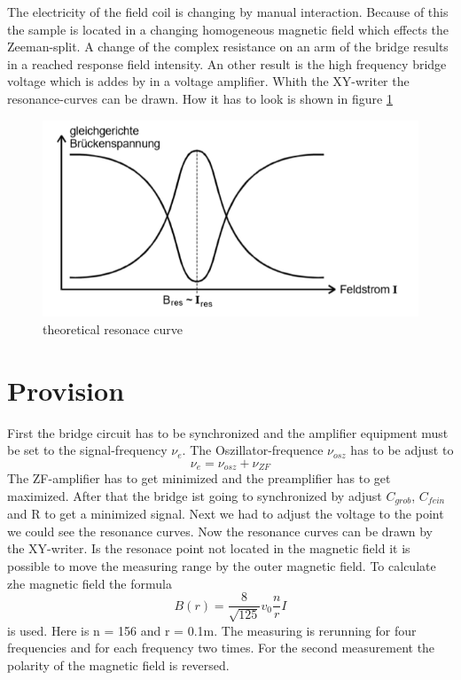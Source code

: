The electricity of the field coil is changing by manual interaction.
Because of this the sample is located in a changing homogeneous magnetic field which effects the Zeeman-split.
A change of the complex resistance on an arm of the bridge results in a reached response field intensity.
An other result is the high frequency bridge voltage which is addes by in a voltage amplifier.
Whith the XY-writer the resonance-curves can be drawn.
How it has to look is shown in figure \ref{fig:resonanz}
\begin{figure}[H]
  \centering
  \includegraphics[scale=0.6]{pictures/7.png}
  \caption{theoretical resonace curve \cite{anleitung}}
  \label{fig:resonanz}
\end{figure}
\section{Provision}

First the bridge circuit has to be synchronized and the amplifier equipment must be set to the signal-frequency $\nu_e$.
The Oszillator-frequence $\nu_{osz}$ has to be adjust to
\begin{equation*}
  \nu_e = \nu_{osz} +\nu_{ZF}
\end{equation*}
The ZF-amplifier has to get minimized and the preamplifier has to get maximized.
After that the bridge ist going to synchronized by adjust $C_{grob}$, $C_{fein}$ and R to get a minimized signal.
Next we had to adjust the voltage to the point we could see the resonance curves.
Now the resonance curves can be drawn by the XY-writer.
Is the resonace point not located in the magnetic field it is possible to move the measuring range by the outer magnetic field.
To calculate zhe magnetic field the formula
\begin{equation}
  B(r) =\frac{8}{\sqrt{125}}v_0\frac{n}{r}I
  \label{eqn:1}
\end{equation}
is used.
Here is n = 156 and r = 0.1m.
The measuring is rerunning for four frequencies and for each frequency two times.
For the second measurement the polarity of the magnetic field is reversed.
